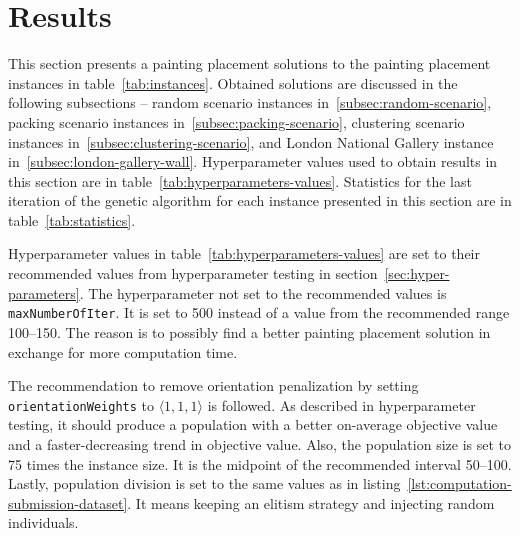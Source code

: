 \clearpage
\newpage


\section{Results}\label{sec:results}
This section presents a painting placement solutions to the painting placement instances in table~\ref{tab:instances}.
Obtained solutions are discussed in the following subsections –
random scenario instances in~\ref{subsec:random-scenario},
packing scenario instances in~\ref{subsec:packing-scenario},
clustering scenario instances in~\ref{subsec:clustering-scenario},
and London National Gallery instance in~\ref{subsec:london-gallery-wall}.
Hyperparameter values used to obtain results in this section are in table~\ref{tab:hyperparameters-values}.
Statistics for the last iteration of the genetic algorithm for each instance presented in this section are in table~\ref{tab:statistics}.

Hyperparameter values in table~\ref{tab:hyperparameters-values} are set to their recommended values
from hyperparameter testing in section~\ref{sec:hyper-parameters}.
The hyperparameter not set to the recommended values is \verb|maxNumberOfIter|.
It is set to 500 instead of a value from the recommended range \numrange{100}{150}.
The reason is to possibly find a better painting placement solution in exchange for more computation time.

The recommendation to remove orientation penalization by setting \verb|orientationWeights| to $\langle 1,1,1\rangle$ is followed.
As described in hyperparameter testing, it should produce a population with a better on-average objective value and a faster-decreasing trend in objective value.
Also, the population size is set to 75 times the instance size.
It is the midpoint of the recommended interval \numrange{50}{100}.
Lastly, population division is set to the same values as in listing~\ref{lst:computation-submission-dataset}.
It means keeping an elitism strategy and injecting random individuals.


